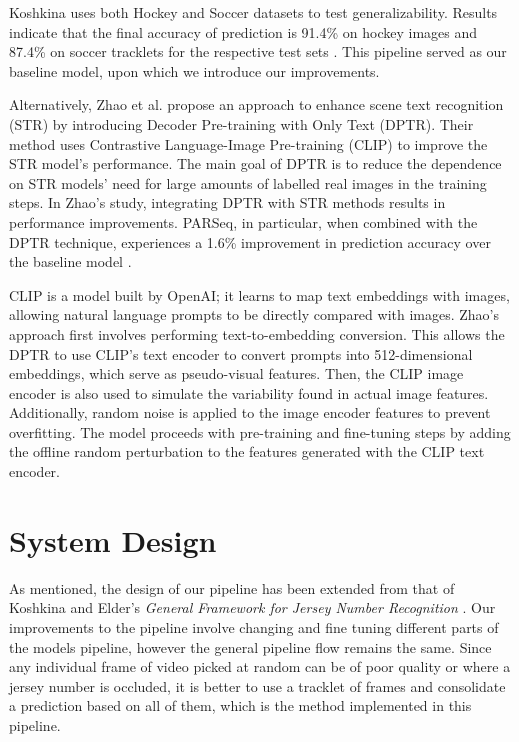 \documentclass[11pt, letterpaper]{article}
\begin{document}
Koshkina uses both Hockey and Soccer datasets to test generalizability. Results indicate that the final accuracy of prediction is 91.4\% on hockey images and 87.4\% on soccer tracklets for the respective test sets \cite{main_paper}. This pipeline served as our baseline model, upon which we introduce our improvements.

Alternatively, Zhao et al. \cite{zhao_decoder} propose an approach to enhance scene text recognition (STR) by introducing Decoder Pre-training with Only Text (DPTR). Their method uses Contrastive Language-Image Pre-training (CLIP) to improve the STR model's performance.  The main goal of DPTR is to reduce the dependence on STR models' need for large amounts of labelled real images in the training steps. In Zhao's study, integrating DPTR with STR methods results in performance improvements. PARSeq, in particular, when combined with the DPTR technique, experiences a 1.6\% improvement in prediction accuracy over the baseline model \cite{zhao_decoder}.

CLIP is a model built by OpenAI; it learns to map text embeddings with images, allowing natural language prompts to be directly compared with images. Zhao's approach first involves performing text-to-embedding conversion. This allows the DPTR to use CLIP's text encoder to convert prompts into 512-dimensional embeddings, which serve as pseudo-visual features. Then, the CLIP image encoder is also used to simulate the variability found in actual image features. Additionally, random noise is applied to the image encoder features to prevent overfitting. The model proceeds with pre-training and fine-tuning steps by adding the offline random perturbation to the features generated with the CLIP text encoder. 

\section{System Design}

As mentioned, the design of our pipeline has been extended from that of Koshkina and Elder's \emph{General Framework for Jersey Number Recognition} \cite{main_paper}. Our improvements to the pipeline involve changing and fine tuning different parts of the models pipeline, however the general pipeline flow remains the same. Since any individual frame of video picked at random can be of poor quality or where a jersey number is occluded, it is better to use a tracklet of frames and consolidate a prediction based on all of them, which is the method implemented in this pipeline.
\end{document}
